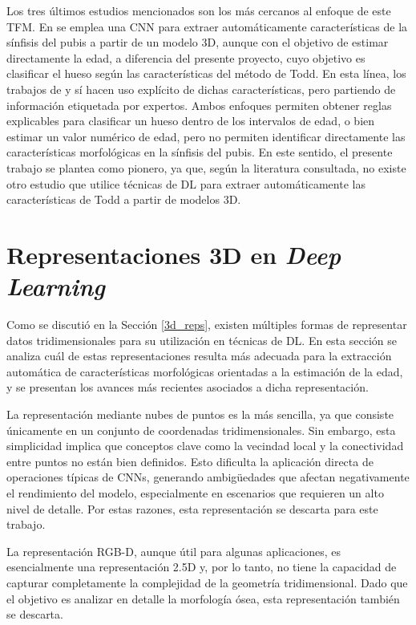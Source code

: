 Los tres últimos estudios mencionados son los más cercanos al enfoque de este TFM. En \cite{koterova_computational_2022} se emplea una CNN para extraer automáticamente características de la sínfisis del pubis a partir de un modelo 3D, aunque con el objetivo de estimar directamente la edad, a diferencia del presente proyecto, cuyo objetivo es clasificar el hueso según las características del método de Todd. En esta línea, los trabajos de \cite{villar2017first} y \cite{bermejo_interpretable_2025} sí hacen uso explícito de dichas características, pero partiendo de información etiquetada por expertos. Ambos enfoques permiten obtener reglas explicables para clasificar un hueso dentro de los intervalos de edad, o bien estimar un valor numérico de edad, pero no permiten identificar directamente las características morfológicas en la sínfisis del pubis. En este sentido, el presente trabajo se plantea como pionero, ya que, según la literatura consultada, no existe otro estudio que utilice técnicas de DL para extraer automáticamente las características de Todd a partir de modelos 3D.

\section{Representaciones 3D en \textit{Deep Learning}}
Como se discutió en la Sección \ref{3d_reps}, existen múltiples formas de representar datos tridimensionales para su utilización en técnicas de DL. En esta sección se analiza cuál de estas representaciones resulta más adecuada para la extracción automática de características morfológicas orientadas a la estimación de la edad, y se presentan los avances más recientes asociados a dicha representación.

La representación mediante nubes de puntos es la más sencilla, ya que consiste únicamente en un conjunto de coordenadas tridimensionales. Sin embargo, esta simplicidad implica que conceptos clave como la vecindad local y la conectividad entre puntos no están bien definidos. Esto dificulta la aplicación directa de operaciones típicas de CNNs, generando ambigüedades que afectan negativamente el rendimiento del modelo, especialmente en escenarios que requieren un alto nivel de detalle. Por estas razones, esta representación se descarta para este trabajo.

La representación RGB-D, aunque útil para algunas aplicaciones, es esencialmente una representación 2.5D y, por lo tanto, no tiene la capacidad de capturar completamente la complejidad de la geometría tridimensional. Dado que el objetivo es analizar en detalle la morfología ósea, esta representación también se descarta.

